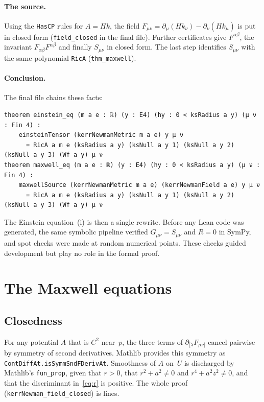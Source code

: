 \documentclass[11pt]{article}
\theoremstyle{definition}
\theoremstyle{remark}
\newcommand{\lean}[1]{\lstinline[basicstyle=\ttfamily\normalsize,columns=fullflexible,breaklines=false]{#1}}
\begin{document}
\paragraph{The source.}
Using the \lean{HasCP} rules for $A=Hk$, the field $F_{\mu\nu}=\partial_\mu(Hk_\nu)-\partial_\nu(Hk_\mu)$ is put in closed form (\lean{field_closed} in the final file).
Further certificates give $F^{\alpha\beta}$, the invariant $F_{\alpha\beta}F^{\alpha\beta}$ and finally $S_{\mu\nu}$ in closed form.
The last step identifies $S_{\mu\nu}$ with the same polynomial \lean{RicA} (\lean{thm_maxwell}).

\paragraph{Conclusion.}
The final file chains these facts:
\begin{lstlisting}
theorem einstein_eq (m a e : ℝ) (y : E4) (hy : 0 < ksRadius a y) (μ ν : Fin 4) :
    einsteinTensor (kerrNewmanMetric m a e) y μ ν
      = RicA a m e (ksRadius a y) (ksNull a y 1) (ksNull a y 2) (ksNull a y 3) (Wf a y) μ ν
theorem maxwell_eq (m a e : ℝ) (y : E4) (hy : 0 < ksRadius a y) (μ ν : Fin 4) :
    maxwellSource (kerrNewmanMetric m a e) (kerrNewmanField a e) y μ ν
      = RicA a m e (ksRadius a y) (ksNull a y 1) (ksNull a y 2) (ksNull a y 3) (Wf a y) μ ν
\end{lstlisting}
\noindent The Einstein equation~(i) is then a single rewrite.
Before any Lean code was generated, the same symbolic pipeline verified $G_{\mu\nu}=S_{\mu\nu}$ and $R=0$ in SymPy, and spot checks were made at random numerical points.
These checks guided development but play no role in the formal proof.

\section{The Maxwell equations}\label{sec:maxwell}

\subsection{Closedness}

For any potential $A$ that is $C^2$ near~$p$, the three terms of $\partial_{[\lambda}F_{\mu\nu]}$ cancel pairwise by symmetry of second derivatives.
Mathlib provides this symmetry as \lean{ContDiffAt.isSymmSndFDerivAt}.
Smoothness of $A$ on~$U$ is discharged by Mathlib's \lean{fun_prop}, given that $r>0$, that $r^2+a^2\neq0$ and $r^4+a^2z^2\neq0$, and that the discriminant in~\eqref{eq:r} is positive.
The whole proof (\lean{kerrNewman_field_closed}) is \NumLinesFieldClosed{} lines.
\end{document}
